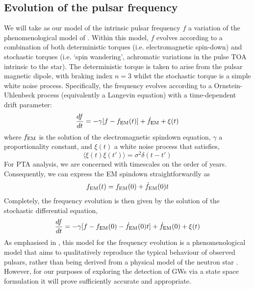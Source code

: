 \documentclass[fleqn,usenatbib,useAMS]{mnras}
\begin{document}
\subsection{Evolution of the pulsar frequency}
We will take as our model of the intrinsic pulsar frequency $f$ a variation of the phenomenological model of \citep{Vargas}. Within this model, $f$ evolves according to a combination of both deterministic torques (i.e. electromagnetic spin-down) and stochastic torques (i.e. `spin wandering', achromatic variations in the pulse TOA intrinsic to the star). The deterministic torque is taken to arise from the pulsar magnetic dipole, with braking index $n=3$ whilst the stochastic torque is a simple white noise process. Specifically, the frequency evolves according to a Ornstein-Uhlenbeck process (equivalently a Langevin equation) with a time-dependent drift parameter:
\begin{equation}
	\frac{df}{dt} = -\gamma	 [f - f_{\rm EM} (t)] + \dot{f}_{\rm EM} + \xi(t)
	\label{eq:frequency_evolution}
\end{equation}
where $f_{\rm EM}$ is the solution of the electromagnetic spindown equation, $\gamma$ a proportionality constant, and $\xi(t)$ a white noise process that satisfies,
\begin{equation}
	\langle \xi(t) \xi(t') \rangle = \sigma^2 \delta(t - t')
\end{equation}
For PTA analysis, we are concerned with timescales on the order of years. Consequently, we can express the EM spindown straightforwardly as
\begin{equation}
	f_{\rm EM} (t) = f_{\rm EM}(0) + \dot{f}_{\rm EM} (0)t
\end{equation}  
Completely, the frequency evolution is then given by the solution of the stochastic differential equation,
\begin{equation}
	\frac{df}{dt} = -\gamma	 [f - f_{\rm EM}(0) - \dot{f}_{\rm EM} (0)t] + \dot{f}_{\rm EM} (0) + \xi(t)
	\label{eq:frequency_evolution_expanded}
\end{equation}
As emphasised in \cite{Vargas}, this model for the frequency evolution is a phenomenological model that aims to qualitatively reproduce the typical behaviour of observed pulsars, rather than being derived from a physical model of the neutron star \citep[e.g. a model of the neutron star crust and superfluid components][]{Meyers2021}. However, for our purposes of exploring the detection of GWs via a state space formulation it will prove sufficiently accurate and appropriate.
\end{document}
